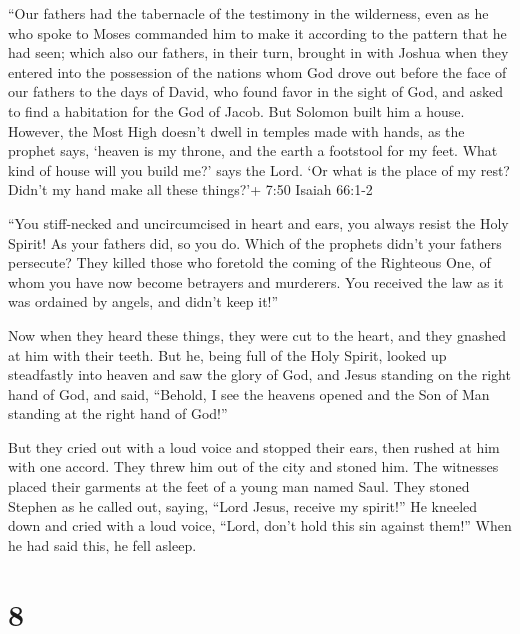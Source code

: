  ``Our fathers had the tabernacle of the testimony in the
wilderness, even as he who spoke to Moses commanded him to make it
according to the pattern that he had seen;  which also our
fathers, in their turn, brought in with Joshua when they entered into
the possession of the nations whom God drove out before the face of our
fathers to the days of David,  who found favor in the sight
of God, and asked to find a habitation for the God of Jacob.
 But Solomon built him a house.  However, the
Most High doesn't dwell in temples made with hands, as the prophet says,
 `heaven is my throne, and the earth a footstool for my
feet. What kind of house will you build me?' says the Lord. `Or what is
the place of my rest?  Didn't my hand make all these
things?'+ 7:50 Isaiah 66:1-2

 ``You stiff-necked and uncircumcised in heart and ears,
you always resist the Holy Spirit! As your fathers did, so you do.
 Which of the prophets didn't your fathers persecute? They
killed those who foretold the coming of the Righteous One, of whom you
have now become betrayers and murderers.  You received the
law as it was ordained by angels, and didn't keep it!''

 Now when they heard these things, they were cut to the
heart, and they gnashed at him with their teeth.  But he,
being full of the Holy Spirit, looked up steadfastly into heaven and saw
the glory of God, and Jesus standing on the right hand of God,
 and said, ``Behold, I see the heavens opened and the Son
of Man standing at the right hand of God!''

 But they cried out with a loud voice and stopped their
ears, then rushed at him with one accord.  They threw him
out of the city and stoned him. The witnesses placed their garments at
the feet of a young man named Saul.  They stoned Stephen as
he called out, saying, ``Lord Jesus, receive my spirit!'' 
He kneeled down and cried with a loud voice, ``Lord, don't hold this sin
against them!'' When he had said this, he fell asleep.

\hypertarget{section-7}{%
\section{8}\label{section-7}}

